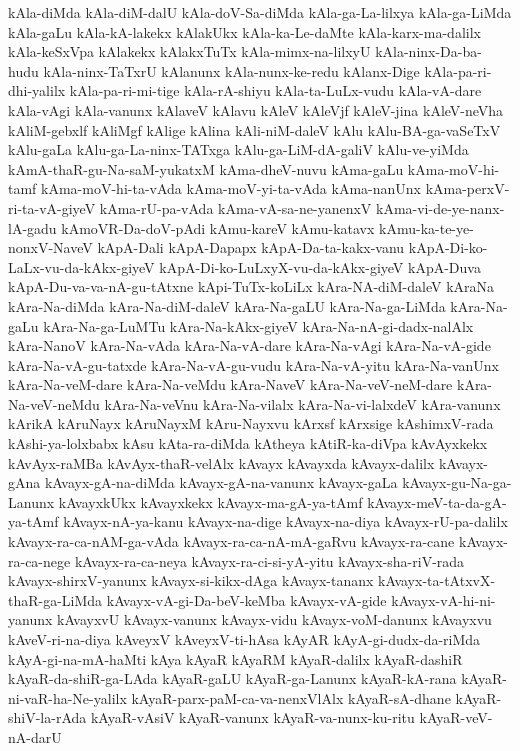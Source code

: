 {kAla-diMda
kAla-diM-dalU
kAla-doV-Sa-diMda
kAla-ga-La-lilxya
kAla-ga-LiMda
kAla-gaLu
kAla-kA-lakekx
kAlakUkx
kAla-ka-Le-daMte
kAla-karx-ma-dalilx
kAla-keSxVpa
kAlakekx
kAlakxTuTx
kAla-mimx-na-lilxyU
kAla-ninx-Da-ba-hudu
kAla-ninx-TaTxrU
kAlanunx
kAla-nunx-ke-redu
kAlanx-Dige
kAla-pa-ri-dhi-yalilx
kAla-pa-ri-mi-tige
kAla-rA-shiyu
kAla-ta-LuLx-vudu
kAla-vA-dare
kAla-vAgi
kAla-vanunx
kAlaveV
kAlavu
kAleV
kAleVjf
kAleV-jina
kAleV-neVha
kAliM-gebxlf
kAliMgf
kAlige
kAlina
kAli-niM-daleV
kAlu
kAlu-BA-ga-vaSeTxV
kAlu-gaLa
kAlu-ga-La-ninx-TATxga
kAlu-ga-LiM-dA-galiV
kAlu-ve-yiMda
kAmA-thaR-gu-Na-saM-yukatxM
kAma-dheV-nuvu
kAma-gaLu
kAma-moV-hi-tamf
kAma-moV-hi-ta-vAda
kAma-moV-yi-ta-vAda
kAma-nanUnx
kAma-perxV-ri-ta-vA-giyeV
kAma-rU-pa-vAda
kAma-vA-sa-ne-yanenxV
kAma-vi-de-ye-nanx-lA-gadu
kAmoVR-Da-doV-pAdi
kAmu-kareV
kAmu-katavx
kAmu-ka-te-ye-nonxV-NaveV
kApA-Dali
kApA-Dapapx
kApA-Da-ta-kakx-vanu
kApA-Di-ko-LaLx-vu-da-kAkx-giyeV
kApA-Di-ko-LuLxyX-vu-da-kAkx-giyeV
kApA-Duva
kApA-Du-va-va-nA-gu-tAtxne
kApi-TuTx-koLiLx
kAra-NA-diM-daleV
kAraNa
kAra-Na-diMda
kAra-Na-diM-daleV
kAra-Na-gaLU
kAra-Na-ga-LiMda
kAra-Na-gaLu
kAra-Na-ga-LuMTu
kAra-Na-kAkx-giyeV
kAra-Na-nA-gi-dadx-nalAlx
kAra-NanoV
kAra-Na-vAda
kAra-Na-vA-dare
kAra-Na-vAgi
kAra-Na-vA-gide
kAra-Na-vA-gu-tatxde
kAra-Na-vA-gu-vudu
kAra-Na-vA-yitu
kAra-Na-vanUnx
kAra-Na-veM-dare
kAra-Na-veMdu
kAra-NaveV
kAra-Na-veV-neM-dare
kAra-Na-veV-neMdu
kAra-Na-veVnu
kAra-Na-vilalx
kAra-Na-vi-lalxdeV
kAra-vanunx
kArikA
kAruNayx
kAruNayxM
kAru-Nayxvu
kArxsf
kArxsige
kAshimxV-rada
kAshi-ya-lolxbabx
kAsu
kAta-ra-diMda
kAtheya
kAtiR-ka-diVpa
kAvAyxkekx
kAvAyx-raMBa
kAvAyx-thaR-velAlx
kAvayx
kAvayxda
kAvayx-dalilx
kAvayx-gAna
kAvayx-gA-na-diMda
kAvayx-gA-na-vanunx
kAvayx-gaLa
kAvayx-gu-Na-ga-Lanunx
kAvayxkUkx
kAvayxkekx
kAvayx-ma-gA-ya-tAmf
kAvayx-meV-ta-da-gA-ya-tAmf
kAvayx-nA-ya-kanu
kAvayx-na-dige
kAvayx-na-diya
kAvayx-rU-pa-dalilx
kAvayx-ra-ca-nAM-ga-vAda
kAvayx-ra-ca-nA-mA-gaRvu
kAvayx-ra-cane
kAvayx-ra-ca-nege
kAvayx-ra-ca-neya
kAvayx-ra-ci-si-yA-yitu
kAvayx-sha-riV-rada
kAvayx-shirxV-yanunx
kAvayx-si-kikx-dAga
kAvayx-tananx
kAvayx-ta-tAtxvX-thaR-ga-LiMda
kAvayx-vA-gi-Da-beV-keMba
kAvayx-vA-gide
kAvayx-vA-hi-ni-yanunx
kAvayxvU
kAvayx-vanunx
kAvayx-vidu
kAvayx-voM-danunx
kAvayxvu
kAveV-ri-na-diya
kAveyxV
kAveyxV-ti-hAsa
kAyAR
kAyA-gi-dudx-da-riMda
kAyA-gi-na-mA-haMti
kAya
kAyaR
kAyaRM
kAyaR-dalilx
kAyaR-dashiR
kAyaR-da-shiR-ga-LAda
kAyaR-gaLU
kAyaR-ga-Lanunx
kAyaR-kA-rana
kAyaR-ni-vaR-ha-Ne-yalilx
kAyaR-parx-paM-ca-va-nenxVlAlx
kAyaR-sA-dhane
kAyaR-shiV-la-rAda
kAyaR-vAsiV
kAyaR-vanunx
kAyaR-va-nunx-ku-ritu
kAyaR-veV-nA-darU
}
